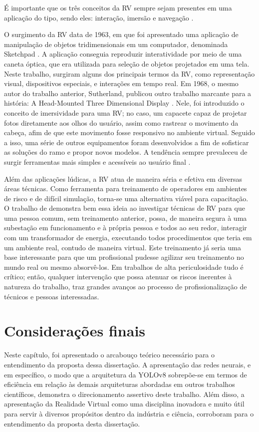 É importante que os três conceitos da RV sempre sejam presentes em uma aplicação do tipo, sendo eles: interação, imersão e navegação \cite{kalawsky1993science}.

O surgimento da RV data de 1963, em que foi apresentado uma aplicação de manipulação de objetos tridimensionais em um computador, denominada Sketchpad \cite {sutherland1963sketchpad}. A aplicação conseguia reproduzir interatividade por meio de uma caneta óptica, que era utilizada para seleção de objetos projetados em uma tela. Neste trabalho, surgiram alguns dos principais termos da RV, como representação visual, dispositivos especiais, e interações em tempo real. Em 1968, o mesmo autor do trabalho anterior, Sutherland, publicou outro trabalho marcante para a história: A Head-Mounted Three Dimensional Display \cite{sutherland1968head}. Nele, foi introduzido o conceito de imersividade para uma RV; no caso, um capacete capaz de projetar fotos diretamente aos olhos do usuário, assim como rastrear o movimento da cabeça, afim de que este movimento fosse responsivo no ambiente virtual. Seguido a isso, uma série de outros equipamentos foram desenvolvidos a fim de sofisticar as soluções do ramo e propor novos modelos. A tendência sempre prevaleceu de surgir ferramentas mais simples e acessíveis ao usuário final \cite{kirner2011evoluccao}.

Além das aplicações lúdicas, a RV atua de maneira séria e efetiva em diversas áreas técnicas. Como ferramenta para treinamento de operadores em ambientes de risco e de difícil simulação, torna-se uma alternativa viável para capacitação.  O trabalho de \cite{silva2012virtual} demonstra bem essa ideia ao investigar técnicas de RV para que uma pessoa comum, sem treinamento anterior, possa, de maneira segura à uma subestação em funcionamento e à própria pessoa e todos ao seu redor, interagir com um transformador de energia, executando todos procedimentos que teria em um ambiente real, contudo de maneira virtual. Este treinamento já seria uma base interessante para que um profissional pudesse agilizar seu treinamento no mundo real ou mesmo absorvê-los. Em trabalhos de alta periculosidade tudo é crítico; então, qualquer intervenção que possa atenuar os riscos inerentes à natureza do trabalho, traz grandes avanços ao processo de profissionalização de técnicos e pessoas interessadas. 

\section{Considerações finais}

Neste capítulo, foi apresentado o arcabouço teórico necessário para o entendimento da proposta dessa dissertação. A apresentação das redes neurais, e em específico, o modo que a arquitetura da YOLOv8 sobrepõe-se em termos de eficiência em relação às demais arquiteturas abordadas em outros trabalhos científicos, demonstra o direcionamento assertivo deste trabalho. Além disso, a apresentação da Realidade Virtual como uma disciplina inovadora e muito útil para servir à diversos propósitos dentro da indústria e ciência, corroboram para o entendimento da proposta desta dissertação.